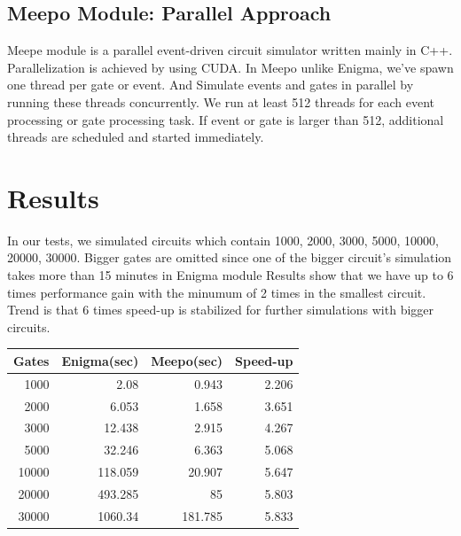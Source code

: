 \documentclass[a4paper,onesided,12pt]{report}
\begin{document}
\section{Meepo Module: Parallel Approach}
Meepe module is a parallel event-driven circuit simulator written mainly in C++. Parallelization is achieved by using CUDA. In Meepo unlike Enigma, we've spawn one thread per gate or event. And Simulate events and gates in parallel by running these threads concurrently. We run at least 512 threads for each event processing or gate processing task. If event or gate is larger than 512, additional threads are scheduled and started immediately.
\chapter{Results}
In our tests, we simulated circuits which contain 1000, 2000, 3000, 5000, 10000, 20000, 30000. Bigger gates are omitted since one of the bigger circuit's simulation takes more than 15 minutes in Enigma module Results show that we have up to 6 times performance gain with the minumum of 2 times in the smallest circuit. Trend is that 6 times speed-up is stabilized for further simulations with bigger circuits.

\centering \begin{tabular}{| r | r | r | r |}

\hline                        
Gates & Enigma(sec) & Meepo(sec) & Speed-up \\ \hline 
1000 & 2.08 & 0.943 & 2.206 \\ \hline
2000 & 6.053 & 1.658  & 3.651 \\ \hline
3000 & 12.438 & 2.915 & 4.267 \\ \hline
5000 & 32.246 & 6.363  & 5.068 \\ \hline
10000 & 118.059 & 20.907 & 5.647 \\ \hline
20000 & 493.285 & 85  & 5.803 \\ \hline
30000 & 1060.34 & 181.785  & 5.833 \\ \hline
\end{tabular}
\end{document}
